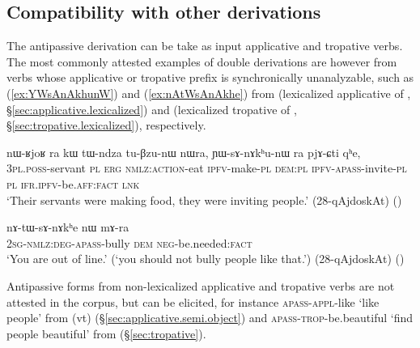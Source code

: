  \subsection{Compatibility with other derivations} \label{sec:antipassive.compatibility}
 The  antipassive derivation can be take as input applicative and tropative verbs. The most commonly attested examples of double derivations are however from verbs whose applicative or tropative prefix is synchronically unanalyzable, such as    (\ref{ex:YWsAnAkhunW}) and   (\ref{ex:nAtWsAnAkhe}) from   (lexicalized applicative of , §\ref{sec:applicative.lexicalized}) and  (lexicalized  tropative of , §\ref{sec:tropative.lexicalized}), respectively.
 
\begin{exe}
\ex \label{ex:YWsAnAkhunW}
\gll  nɯ-ʁjoʁ ra kɯ tɯ-ndza tu-βzu-nɯ nɯra, ɲɯ-sɤ-nɤkʰu-nɯ ra pjɤ-ɕti qʰe,  \\
\textsc{3pl}.\textsc{poss}-servant \textsc{pl} \textsc{erg} \textsc{nmlz}:\textsc{action}-eat \textsc{ipfv}-make-\textsc{pl} \textsc{dem}:\textsc{pl} \textsc{ipfv}-\textsc{apass}-invite-\textsc{pl} \textsc{pl} \textsc{ifr}.\textsc{ipfv}-be.\textsc{aff}:\textsc{fact} \textsc{lnk} \\
\glt `Their servants were making food, they were inviting people.' (28-qAjdoskAt) 	()
  \end{exe}
  
 \begin{exe}
\ex \label{ex:nAtWsAnAkhe}
\gll  nɤ-tɯ-sɤ-nɤkʰe nɯ mɤ-ra \\
\textsc{2sg}-\textsc{nmlz}:\textsc{deg}-\textsc{apass}-bully \textsc{dem} \textsc{neg}-be.needed:\textsc{fact} \\
\glt `You are out of line.' (`you should not bully people like that.') (28-qAjdoskAt) 
()
 \end{exe}
 
Antipassive forms from non-lexicalized applicative and tropative verbs are not attested in the corpus, but can be elicited, for instance  \textsc{apass}-\textsc{appl}-like `like people' from   (vt) (§\ref{sec:applicative.semi.object}) and  \textsc{apass}-\textsc{trop}-be.beautiful `find people beautiful' from   (§\ref{sec:tropative}).

